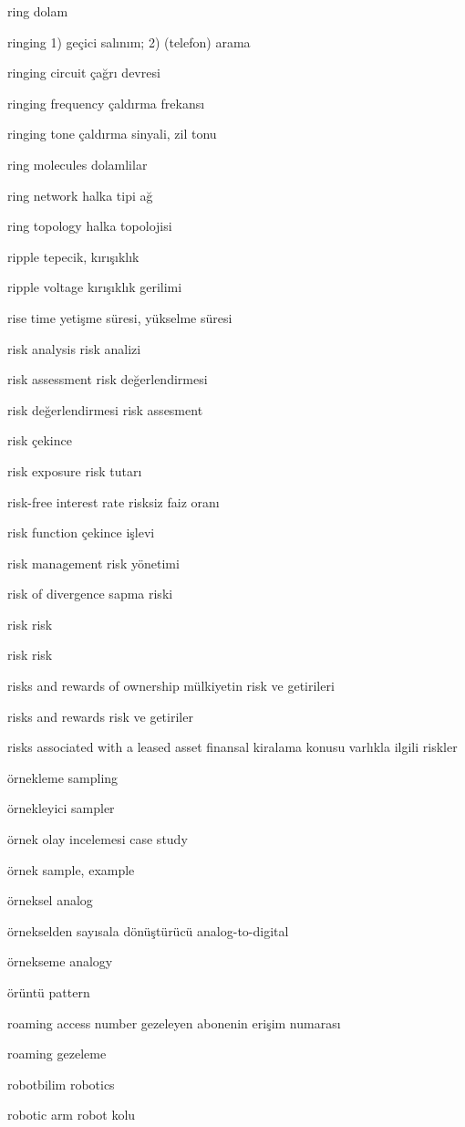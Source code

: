 \documentclass[12pt,fleqn]{article}\usepackage{../../common}
\begin{document}
ring dolam

ringing 1) geçici salınım; 2) (telefon) arama

ringing circuit çağrı devresi

ringing frequency çaldırma frekansı

ringing tone çaldırma sinyali, zil tonu

ring molecules dolamlilar

ring network halka tipi ağ

ring topology halka topolojisi

ripple tepecik, kırışıklık

ripple voltage kırışıklık gerilimi

rise time yetişme süresi, yükselme süresi

risk analysis risk analizi

risk assessment risk değerlendirmesi

risk değerlendirmesi risk assesment

risk çekince

risk exposure risk tutarı

risk-free interest rate risksiz faiz oranı

risk function çekince işlevi

risk management risk yönetimi

risk of divergence sapma riski

risk risk

risk risk

risks and rewards of ownership mülkiyetin risk ve getirileri

risks and rewards risk ve getiriler

risks associated with a leased asset finansal kiralama konusu varlıkla ilgili riskler

örnekleme sampling

örnekleyici sampler

örnek olay incelemesi case study

örnek sample, example

örneksel analog

örnekselden sayısala dönüştürücü analog-to-digital

örnekseme analogy

örüntü pattern

roaming access number gezeleyen abonenin erişim numarası

roaming gezeleme

robotbilim robotics

robotic arm robot kolu
\end{document}
